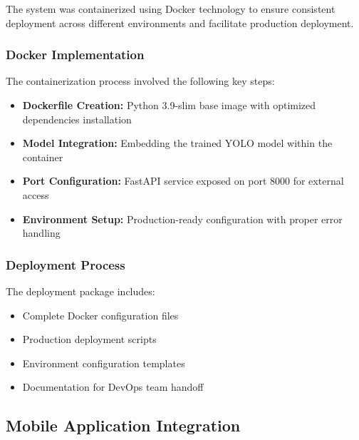 \documentclass[12pt,a4paper]{report}
\begin{document}
The system was containerized using Docker technology to ensure consistent deployment across different environments and facilitate production deployment.

\subsubsection{Docker Implementation}

The containerization process involved the following key steps:

\begin{itemize}
    \item \textbf{Dockerfile Creation:} Python 3.9-slim base image with optimized dependencies installation
    \item \textbf{Model Integration:} Embedding the trained YOLO model within the container
    \item \textbf{Port Configuration:} FastAPI service exposed on port 8000 for external access
    \item \textbf{Environment Setup:} Production-ready configuration with proper error handling
\end{itemize}

\subsubsection{Deployment Process}

The deployment package includes:

\begin{itemize}
    \item Complete Docker configuration files
    \item Production deployment scripts
    \item Environment configuration templates
    \item Documentation for DevOps team handoff
\end{itemize}






\subsection{Mobile Application Integration}
\end{document}
